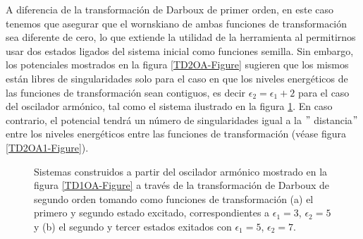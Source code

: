 A diferencia de la transformación de Darboux de primer orden, en este caso tenemos que asegurar que el wornskiano de ambas funciones de transformación sea diferente de cero, lo que extiende la utilidad de la herramienta al permitirnos usar dos estados ligados del sistema inicial como funciones semilla. Sin embargo, los potenciales mostrados en la figura  \ref{TD2OA-Figure} sugieren que los mismos están libres de singularidades solo para el caso en que los niveles energéticos de las funciones de transformación sean contiguos, es decir $\epsilon_2 = \epsilon_1 + 2$ para el caso del oscilador armónico, tal como el sistema ilustrado en la figura \ref{TD2OA0-Figure}. En caso contrario, el potencial tendrá un número de singularidades igual a la $"$ distancia$"$ entre los niveles energéticos entre las funciones de transformación (véase figura \ref{TD2OA1-Figure}).

\begin{figure}
	\centering
	\hfill%
	\caption{\label{TD2OA0-Figure} Sistemas construidos a partir del oscilador armónico mostrado en la figura \ref{TD1OA-Figure} a través de la transformación de Darboux de segundo orden tomando como funciones de transformación  (a) el primero y segundo estado excitado, correspondientes a $\epsilon_1=3$, $\epsilon_2=5$ y  (b) el segundo y tercer estados exitados con $\epsilon_1=5$, $\epsilon_2=7$.
	 }
\end{figure}

